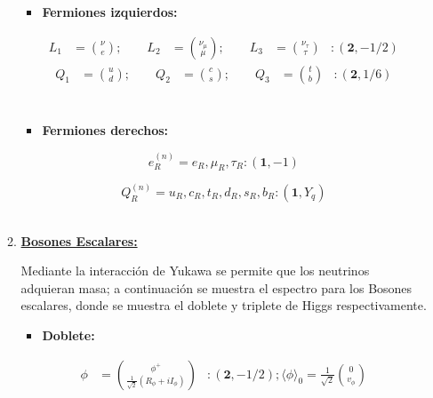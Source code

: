 \documentclass[12pt]{article}
\begin{document}
\begin{enumerate}
\begin{enumerate}
\begin{itemize}
\item \textbf{Fermiones izquierdos:} 
\end{itemize}

\begin{equation}
\begin{aligned}
      L_1 & = \binom{\nu}{e}; \qquad   L_2 & = \binom{\nu_\mu}{\mu}  ; \qquad   L_3& = \binom{\nu_\tau}{\tau}   & :  (\textbf{2}, -1/2)  
\end{aligned}
\end{equation}
\begin{equation}
\begin{aligned}
   Q_1 & = \binom{u}{d};  \qquad Q_2 & = \binom{c}{s};  \qquad  Q_3 & = \binom{t}{b}   & :  (\textbf{2}, 1/6) \\ 
\end{aligned}
\end{equation} \\

\begin{itemize}
\item \textbf{Fermiones derechos:}
\end{itemize} 

\begin{equation}
 e_R^{(n)} = e_R, \mu_R , \tau_R: (\textbf{1}, -1)
\end{equation}

\begin{equation}
 Q_R^{(n)} = u_R, c_R , t_R, d_R, s_R, b_R   : (\textbf{1}, Y_q)
\end{equation} \\ 



\item\underline{ \textbf{Bosones Escalares:}}

Mediante la interacción de Yukawa se permite que los neutrinos adquieran masa; a continuación se muestra el espectro para los Bosones escalares, donde se muestra el doblete y triplete de Higgs respectivamente. 


\begin{itemize}
\item \textbf{Doblete:}
\end{itemize}

\begin{equation}
\begin{aligned}
      \phi & = \binom{\phi^{+}}{\frac{1}{\sqrt{2}}(R_\phi+iI_\phi )}& :  (\textbf{2}, -1/2);  \langle  \phi \rangle_0 = \frac{1}{\sqrt{2}}  \binom{0}{v_\phi} 
\end{aligned}
\end{equation} \\


\end{enumerate}
\end{enumerate}
\end{document}
